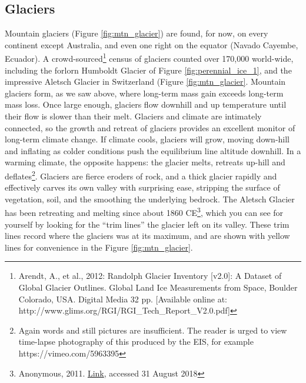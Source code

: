 \subsection{Glaciers}
Mountain glaciers (Figure \ref{fig:mtn_glacier}) are found, for now, on every continent except Australia,  and even one right on the equator (Navado Cayembe, Ecuador). A crowd-sourced\footnote{Arendt, A., et al., 2012: Randolph Glacier Inventory [v2.0]: A Dataset of Global Glacier Outlines. Global Land Ice Measurements from Space, Boulder Colorado, USA. Digital Media 32 pp. [Available online at: http://www.glims.org/RGI/RGI\_Tech\_Report\_V2.0.pdf]} census of glaciers counted over 170,000 world-wide, including the forlorn Humboldt Glacier of Figure \ref{fig:perennial_ice_1}, and the impressive Aletsch Glacier in Switzerland (Figure \ref{fig:mtn_glacier}. Mountain glaciers form, as we saw above, where long-term mass gain exceeds long-term mass loss. Once large enough, glaciers flow downhill and up temperature until their flow is slower than their melt. Glaciers and climate are intimately connected, so the growth and retreat of glaciers provides an excellent monitor of long-term climate change. If climate cools, glaciers will grow, moving down-hill and inflating as colder conditions push the equilibrium line altitude downhill. In a warming climate, the opposite happens: the glacier melts, retreats up-hill and deflates\footnote{Again words and still pictures are insufficient. The reader is urged to view time-lapse photography of this produced by the EIS, for example https://vimeo.com/5963395}. Glaciers are fierce eroders of rock, and a thick glacier rapidly and effectively carves its own valley with surprising ease, stripping the surface of vegetation, soil, and the smoothing the underlying bedrock. The Aletsch Glacier has been retreating and melting since about 1860 CE\footnote{Anonymous, 2011. \href{http://archive.sciencewatch.com/dr/erf/2011/11feberf/11feberfHolz/}{Link}, accessed 31 August 2018}, which you can see for yourself by looking for the ``trim lines'' the glacier left on its valley. These trim lines record where the glaciers was at its maximum, and are shown with yellow lines for convenience in the Figure \ref{fig:mtn_glacier}. \\

